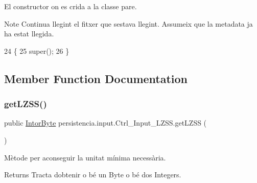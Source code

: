El constructor on es crida a la classe pare. 

\begin{DoxyNote}{Note}
Continua llegint el fitxer que s\textquotesingle{}estava llegint. Assumeix que la metadata ja ha estat llegida. 
\end{DoxyNote}

\begin{DoxyCode}
24                              \{
25         super();
26     \}
\end{DoxyCode}


\subsection{Member Function Documentation}
\mbox{\label{classpersistencia_1_1input_1_1Ctrl__Input__LZSS_a204d4d68a1d94725d9017b71bac0288e}} 
\subsubsection{\texorpdfstring{get\+L\+Z\+S\+S()}{getLZSS()}}
{\footnotesize\ttfamily public \hyperlink{classdomini_1_1utils_1_1IntorByte}{Intor\+Byte} persistencia.\+input.\+Ctrl\+\_\+\+Input\+\_\+\+L\+Z\+S\+S.\+get\+L\+Z\+SS (\begin{DoxyParamCaption}{ }\end{DoxyParamCaption})\hspace{0.3cm}{\ttfamily [inline]}}



Mètode per aconseguir la unitat mínima necessària. 

\begin{DoxyReturn}{Returns}
Tracta d\textquotesingle{}obtenir o bé un Byte o bé dos Integers. 
\end{DoxyReturn}

